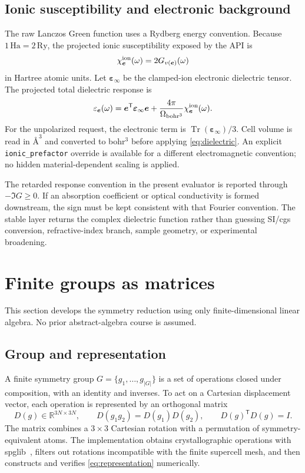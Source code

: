 \documentclass[11pt,a4paper]{article}
\newcommand{\Tr}{\operatorname{Tr}}
\newcommand{\epsinf}{\bm\varepsilon_\infty}
\newcommand{\angstrom}{\text{\AA}}
\begin{document}
\subsection{Ionic susceptibility and electronic background}

The raw Lanczos Green function uses a Rydberg energy convention.  Because
$1\,\mathrm{Ha}=2\,\mathrm{Ry}$, the projected ionic susceptibility exposed
by the API is
\begin{equation}
  \chi^{\rm ion}_{\bm e}(\omega)=2G_{v(\bm e)}(\omega)
  \label{eq:chi-ionic}
\end{equation}
in Hartree atomic units.  Let $\epsinf$ be the clamped-ion electronic
dielectric tensor.  The projected total dielectric response is
\begin{equation}
  \varepsilon_{\bm e}(\omega)=
  \bm e^{\mathsf T}\epsinf\bm e+
  \frac{4\pi}{\Omega_{\rm bohr^3}}
  \chi^{\rm ion}_{\bm e}(\omega).
  \label{eq:dielectric}
\end{equation}
For the unpolarized request, the electronic term is
$\Tr(\epsinf)/3$.  Cell volume is read in $\angstrom^3$ and converted to
bohr$^3$ before applying \cref{eq:dielectric}.  An explicit
\texttt{ionic\_prefactor} override is available for a different
electromagnetic convention; no hidden material-dependent scaling is applied.

The retarded response convention in the present evaluator is reported through
$-\Im G\ge0$.  If an absorption coefficient or optical conductivity is
formed downstream, the sign must be kept consistent with that Fourier
convention.  The stable layer returns the complex dielectric function rather
than guessing SI/cgs conversion, refractive-index branch, sample geometry, or
experimental broadening.

\section{Finite groups as matrices}
\label{sec:group-theory}

This section develops the symmetry reduction using only finite-dimensional
linear algebra.  No prior abstract-algebra course is assumed.

\subsection{Group and representation}

A finite symmetry group $G=\{g_1,\ldots,g_{|G|}\}$ is a set of operations
closed under composition, with an identity and inverses.  To act on a
Cartesian displacement vector, each operation is represented by an
orthogonal matrix
\begin{equation}
  D(g)\in\mathbb R^{3N\times3N},\qquad
  D(g_1g_2)=D(g_1)D(g_2),\qquad D(g)^{\mathsf T}D(g)=I.
  \label{eq:representation}
\end{equation}
The matrix combines a $3\times3$ Cartesian rotation with a permutation of
symmetry-equivalent atoms.  The implementation obtains crystallographic
operations with spglib~\cite{togo2024}, filters out rotations incompatible
with the finite supercell mesh, and then constructs and verifies
\cref{eq:representation} numerically.
\end{document}
